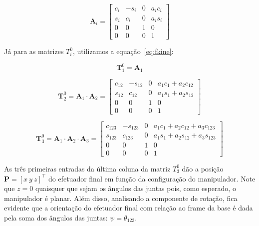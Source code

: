 \begin{equation}
    \mathbf{A}_i = \begin{bmatrix}
        c_i & -s_i & 0 & a_i c_i \\
        s_i & c_i  & 0 & a_i s_i \\
        0   & 0    & 1 & 0       \\
        0   & 0    & 0 & 1
    \end{bmatrix}
\end{equation}

Já para as matrizes \(T^0_i\), utilizamos a equação~\ref{eq:fkine}:

\begin{equation}
    \mathbf{T}^0_1 = \mathbf{A}_1
\end{equation}

\begin{equation}
    \mathbf{T}^0_2 = \mathbf{A}_1 \cdot \mathbf{A}_2 = \begin{bmatrix}
        c_{12} & -s_{12} & 0 & a_1c_1 + a_2c_{12} \\
        s_{12} & c_{12}  & 0 & a_1s_1 + a_2s_{12} \\
        0      & 0       & 1 & 0                  \\
        0      & 0       & 0 & 1
    \end{bmatrix}
\end{equation}

\begin{equation}
    \mathbf{T}^0_3 = \mathbf{A}_1 \cdot \mathbf{A}_2 \cdot \mathbf{A}_3 = \begin{bmatrix}
        c_{123} & -s_{123} & 0 & a_1c_1 + a_2c_{12} + a_3c_{123} \\
        s_{123} & c_{123}  & 0 & a_1s_1 + a_2s_{12} + a_3s_{123} \\
        0       & 0        & 1 & 0                               \\
        0       & 0        & 0 & 1
    \end{bmatrix}
\end{equation}

As três primeiras entradas da última coluna da matriz \(T^0_3\) dão a posição
\(\mathbf{P} = {\left[ x \ y \ z \right]}^{\top}\) do efetuador final em função
da configuração do manipulador. Note que $z = 0$ quaisquer que sejam os ângulos
das juntas pois, como esperado, o manipulador é planar. Além disso, analisando
a componente de rotação, fica evidente que a orientação do efetuador final com
relação ao frame da base é dada pela soma dos ângulos das juntas: $\psi =
    \theta_{123}$.

